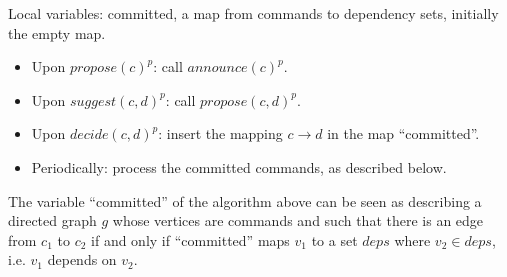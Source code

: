 Local variables: committed, a map from commands to dependency sets, initially the empty map.
\begin{itemize}[noitemsep,nolistsep]
    \item Upon ${propose\left( c \right)}^p$: call ${announce\left( c \right)}^p$.
    \item Upon ${suggest\left( c,d \right)}^p$: call ${propose\left( c,d \right)}^p$.
    \item Upon ${decide\left( c,d \right)}^p$: insert the mapping $c \rightarrow d$ in the map ``committed''.
    \item Periodically: process the committed commands, as described below.
\end{itemize}

The variable ``committed'' of the algorithm above can be seen as describing a directed graph $g$ whose vertices are commands and such that there is an edge from $c_1$ to $c_2$ if and only if ``committed'' maps $v_1$ to a set $deps$ where $v_2\in deps$, i.e. $v_1$ depends on $v_2$.



\printbibliography%


